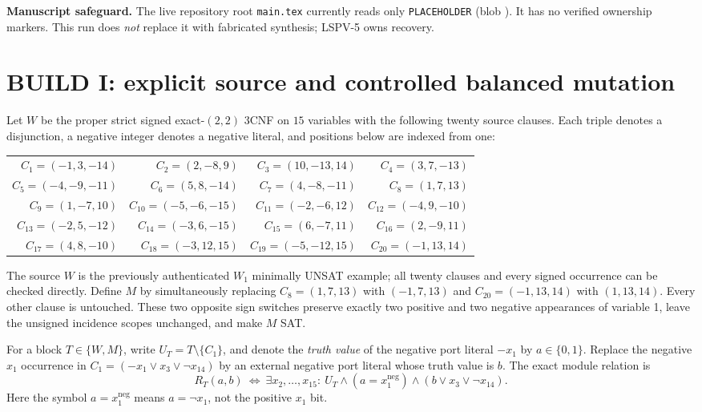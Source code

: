 \documentclass[10pt]{article}
\begin{document}
\textbf{Manuscript safeguard.} The live repository root \texttt{main.tex} currently reads only \texttt{PLACEHOLDER} (blob \texttt{}). It has no verified ownership markers. This run does \emph{not} replace it with fabricated synthesis; LSPV-5 owns recovery.

\section{BUILD I: explicit source and controlled balanced mutation}
Let $W$ be the proper strict signed exact-$(2,2)$ 3CNF on $15$ variables with the following twenty source clauses. Each triple denotes a disjunction, a negative integer denotes a negative literal, and positions below are indexed from one:
\begin{center}\footnotesize
\begin{tabular}{rrrr}
\toprule
$C_1=(-1,3,-14)$ & $C_2=(2,-8,9)$ & $C_3=(10,-13,14)$ & $C_4=(3,7,-13)$\\
$C_5=(-4,-9,-11)$ & $C_6=(5,8,-14)$ & $C_7=(4,-8,-11)$ & $C_8=(1,7,13)$\\
$C_9=(1,-7,10)$ & $C_{10}=(-5,-6,-15)$ & $C_{11}=(-2,-6,12)$ & $C_{12}=(-4,9,-10)$\\
$C_{13}=(-2,5,-12)$ & $C_{14}=(-3,6,-15)$ & $C_{15}=(6,-7,11)$ & $C_{16}=(2,-9,11)$\\
$C_{17}=(4,8,-10)$ & $C_{18}=(-3,12,15)$ & $C_{19}=(-5,-12,15)$ & $C_{20}=(-1,13,14)$\\
\bottomrule
\end{tabular}
\end{center}
The source $W$ is the previously authenticated $W_1$ minimally UNSAT example; all twenty clauses and every signed occurrence can be checked directly. Define $M$ by simultaneously replacing $C_8=(1,7,13)$ with $(-1,7,13)$ and $C_{20}=(-1,13,14)$ with $(1,13,14)$. Every other clause is untouched. These two opposite sign switches preserve exactly two positive and two negative appearances of variable 1, leave the unsigned incidence scopes unchanged, and make $M$ SAT.

For a block $T\in\{W,M\}$, write $U_T=T\setminus\{C_1\}$, and denote the \emph{truth value} of the negative port literal $-x_1$ by $a\in\{0,1\}$. Replace the negative $x_1$ occurrence in $C_1=(-x_1\lor x_3\lor\neg x_{14})$ by an external negative port literal whose truth value is $b$. The exact module relation is
\[
 R_T(a,b)\ \Longleftrightarrow\ \exists x_2,\ldots,x_{15}:\ U_T\land(a=x_1^{\mathrm{neg}})\land(b\lor x_3\lor\neg x_{14}). \tag{1}
\]
Here the symbol $a=x_1^{\mathrm{neg}}$ means $a=\neg x_1$, not the positive $x_1$ bit.
\end{document}
